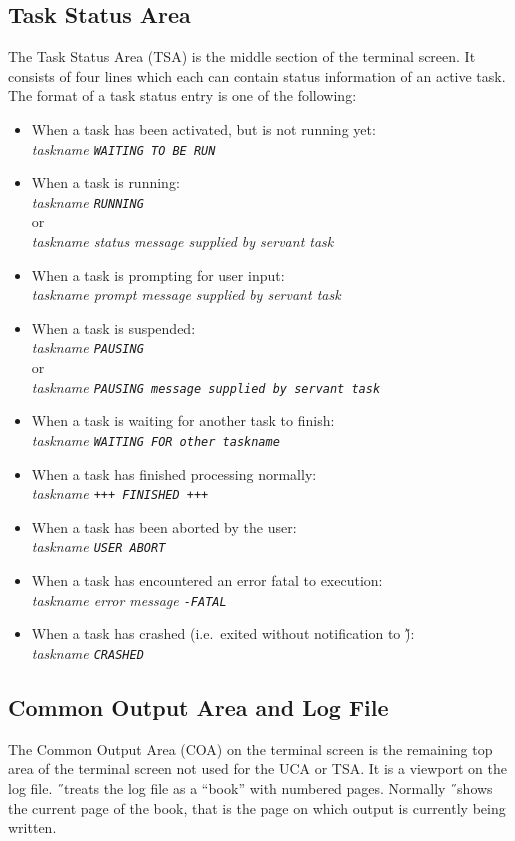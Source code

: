 \subsection{Task Status Area}
The Task Status Area (TSA) is the middle section of the terminal screen.
It consists of four lines which each can contain status information of an active
task.
The format of a task status entry is one of the following:
\begin{itemize}
\item When a task has been activated, but is not running yet:\\
{\it taskname \tt WAITING TO BE RUN}
\item When a task is running:\\
{\it taskname \tt RUNNING}\\
or\\
{\it taskname  status message supplied by servant task}
\item When a task is prompting for user input:\\
{\it taskname  prompt message supplied by servant task}
\item When a task is suspended:\\
{\it taskname \tt PAUSING }\\
or\\
{\it taskname \tt PAUSING \it message supplied by servant task}
\item When a task is waiting for another task to finish:\\
{\it taskname \tt WAITING FOR \it other taskname}
\item When a task has finished processing normally:\\
{\it taskname \tt +++ FINISHED +++}
\item When a task has been aborted by the user:\\
{\it taskname \tt USER ABORT}
\item When a task has encountered an error fatal to execution:\\
{\it taskname error message \tt -FATAL}
\item When a task has crashed (i.e.\ exited without notification to \H):\\
{\it taskname \tt CRASHED}
\end{itemize}

\subsection{Common Output Area and Log File}
The Common Output Area (COA) on the terminal screen is the remaining top area 
of the terminal screen not used for the UCA or TSA.
It is a viewport on the log file.
\H\ treats the log file as a ``book'' with numbered pages.
Normally \H\ shows the current page of the book, that is the page on 
which output is currently being written.

